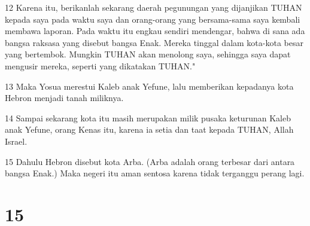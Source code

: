 \par 12 Karena itu, berikanlah sekarang daerah pegunungan yang dijanjikan TUHAN kepada saya pada waktu saya dan orang-orang yang bersama-sama saya kembali membawa laporan. Pada waktu itu engkau sendiri mendengar, bahwa di sana ada bangsa raksasa yang disebut bangsa Enak. Mereka tinggal dalam kota-kota besar yang bertembok. Mungkin TUHAN akan menolong saya, sehingga saya dapat mengusir mereka, seperti yang dikatakan TUHAN."
\par 13 Maka Yosua merestui Kaleb anak Yefune, lalu memberikan kepadanya kota Hebron menjadi tanah miliknya.
\par 14 Sampai sekarang kota itu masih merupakan milik pusaka keturunan Kaleb anak Yefune, orang Kenas itu, karena ia setia dan taat kepada TUHAN, Allah Israel.
\par 15 Dahulu Hebron disebut kota Arba. (Arba adalah orang terbesar dari antara bangsa Enak.) Maka negeri itu aman sentosa karena tidak terganggu perang lagi.

\chapter{15}

